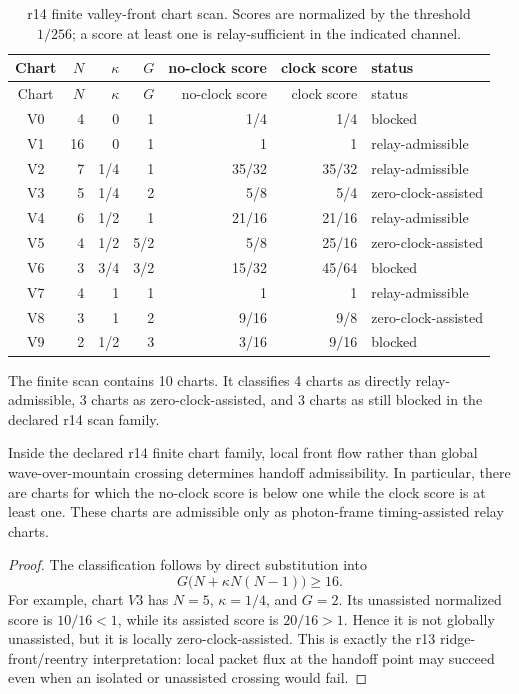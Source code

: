 \begin{center}
\begin{longtable}{c|r|r|r|r|r|l}
\caption{r14 finite valley-front chart scan.  Scores are normalized by the
threshold \(1/256\); a score at least one is relay-sufficient in the indicated
channel.}\\
\toprule
Chart & \(N\) & \(\kappa\) & \(G\) & no-clock score & clock score & status\\
\midrule
\endfirsthead
\toprule
Chart & \(N\) & \(\kappa\) & \(G\) & no-clock score & clock score & status\\
\midrule
\endhead
V0 & 4 & 0 & 1 & 1/4 & 1/4 & blocked \\
V1 & 16 & 0 & 1 & 1 & 1 & relay-admissible \\
V2 & 7 & 1/4 & 1 & 35/32 & 35/32 & relay-admissible \\
V3 & 5 & 1/4 & 2 & 5/8 & 5/4 & zero-clock-assisted \\
V4 & 6 & 1/2 & 1 & 21/16 & 21/16 & relay-admissible \\
V5 & 4 & 1/2 & 5/2 & 5/8 & 25/16 & zero-clock-assisted \\
V6 & 3 & 3/4 & 3/2 & 15/32 & 45/64 & blocked \\
V7 & 4 & 1 & 1 & 1 & 1 & relay-admissible \\
V8 & 3 & 1 & 2 & 9/16 & 9/8 & zero-clock-assisted \\
V9 & 2 & 1/2 & 3 & 3/16 & 9/16 & blocked \\
\bottomrule
\end{longtable}
\end{center}

The finite scan contains 10 charts.  It classifies 4 charts as directly
relay-admissible, 3 charts as zero-clock-assisted, and 3 charts as still
blocked in the declared r14 scan family.

\begin{proposition}
\label{prop:v470-r14-finite-flowrate-classification}
Inside the declared r14 finite chart family, local front flow rather than global
wave-over-mountain crossing determines handoff admissibility.  In particular,
there are charts for which the no-clock score is below one while the clock score
is at least one.  These charts are admissible only as photon-frame timing-assisted
relay charts.
\end{proposition}

\begin{proof}
The classification follows by direct substitution into
\[
G\bigl(N+\kappa N(N-1)\bigr)\geq16.
\]
For example, chart \(V3\) has \(N=5\), \(\kappa=1/4\), and \(G=2\).  Its
unassisted normalized score is \(10/16<1\), while its assisted score is
\(20/16>1\).  Hence it is not globally unassisted, but it is locally
zero-clock-assisted.  This is exactly the r13 ridge-front/reentry interpretation:
local packet flux at the handoff point may succeed even when an isolated or
unassisted crossing would fail.
\end{proof}


